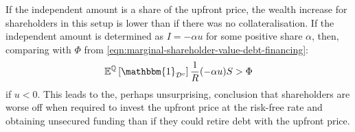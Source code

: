 \documentclass[main.tex]{subfiles}
\begin{document}
        If the independent amount is a share of the upfront price, 
        the wealth increase for shareholders in this setup is lower than
        if there was no collateralisation. 
        If the independent amount is determined as $I=-\alpha u$ for some positive share $\alpha$, 
        then, comparing with $\Phi$ from \cref*{eqn:marginal-shareholder-value-debt-financing}:
        \begin{equation*}
            \mathbb{E}^{\mathbb{Q}}\left[
                \mathbbm{1}_{\mathcal{D}^{c}}
            \right] \discountfactor (-\alpha u) S
            >
            \Phi
        \end{equation*}
        if $u<0$.
        This leads to the, perhaps unsurprising, conclusion
        that shareholders are worse off when required to invest the upfront price at the risk-free rate
        and obtaining unsecured funding
        than if they could retire debt with the upfront price.
\end{document}
